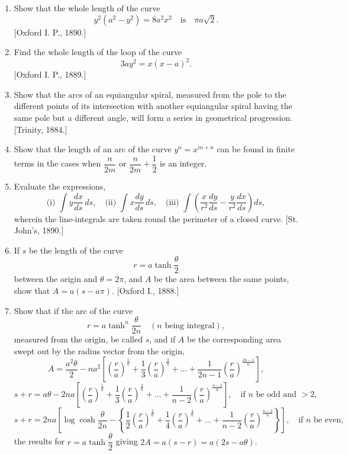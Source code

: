 \documentclass[11pt, a4paper]{article}
\newcommand{\source}[1]{\hfill\textnormal{[#1]}}
\begin{document}
\begin{enumerate}[leftmargin=2em]

\item Show that the whole length of the curve
\[
y^2(a^2-y^2)=8a^2x^2\quad\text{is}\quad\pi a\sqrt2.
\]
\source{Oxford I. P., 1890.}

\item Find the whole length of the loop of the curve
\[
3ay^2=x(x-a)^2.
\]
\source{Oxford I. P., 1889.}

\item Show that the arcs of an equiangular spiral, measured from the pole to the different points of its intersection with another equiangular spiral having the same pole but a different angle, will form a series in geometrical progression. \source{Trinity, 1884.}

\item Show that the length of an arc of the curve $y^n=x^{m+n}$ can be found in finite terms in the cases when $\dfrac{n}{2m}$ or $\dfrac{n}{2m}+\dfrac12$ is an integer.

\item Evaluate the expressions,
\[
\text{(i) }\int y\frac{dx}{ds}\,ds,\quad\text{(ii) }\int x\frac{dy}{ds}\,ds,\quad\text{(iii) }\int\left(\frac{x}{r^2}\frac{dy}{ds}-\frac{y}{r^2}\frac{dx}{ds}\right)ds,
\]
wherein the line-integrals are taken round the perimeter of a closed curve. \source{St. John's, 1890.}

\item If $s$ be the length of the curve
\[
r=a\tanh\frac{\theta}{2}
\]
between the origin and $\theta=2\pi$, and $A$ be the area between the same points, show that $A=a(s-a\pi)$. \source{Oxford I., 1888.}

\item Show that if the arc of the curve
\[
r=a\tanh^n\frac{\theta}{2n}\quad(n\text{ being integral}),
\]
measured from the origin, be called $s$, and if $A$ be the corresponding area swept out by the radius vector from the origin,
\[
A=\frac{a^2\theta}{2}-na^2\left[\left(\frac{r}{a}\right)^{\frac1n}+\frac13\left(\frac{r}{a}\right)^{\frac3n}+\dots+\frac{1}{2n-1}\left(\frac{r}{a}\right)^{\frac{2n-1}{n}}\right],
\]
\[
s+r=a\theta-2na\left[\left(\frac{r}{a}\right)^{\frac1n}+\frac13\left(\frac{r}{a}\right)^{\frac3n}+\dots+\frac{1}{n-2}\left(\frac{r}{a}\right)^{\frac{n-2}{n}}\right],\quad\text{if }n\text{ be odd and }>2,
\]
\[
s+r=2na\left[\log\cosh\frac{\theta}{2n}-\left\{\frac12\left(\frac{r}{a}\right)^{\frac2n}+\frac14\left(\frac{r}{a}\right)^{\frac4n}+\dots+\frac{1}{n-2}\left(\frac{r}{a}\right)^{\frac{n-2}{n}}\right\}\right],\quad\text{if }n\text{ be even,}
\]
the results for $r=a\tanh\dfrac{\theta}{2}$ giving $2A=a(s-r)=a(2s-a\theta)$.


\end{enumerate}
\end{document}
